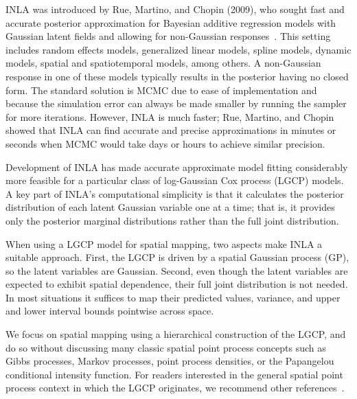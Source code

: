 \documentclass[]{interact}
\begin{document}
INLA was introduced by Rue, Martino, and Chopin (2009), who sought fast and
accurate posterior approximation for Bayesian additive regression models with
Gaussian latent fields and allowing for non-Gaussian responses~\cite{rueetal}.
This setting includes random effects models, generalized linear models, spline
models, dynamic models, spatial and spatiotemporal models, among others.
A non-Gaussian response in one of these models typically results in the
posterior having no closed form. The standard solution is MCMC due to ease of
implementation and because the simulation error can always be made smaller by
running the sampler for more iterations. However, INLA is much faster; Rue,
Martino, and Chopin showed that INLA can find accurate and precise
approximations in minutes or seconds when MCMC would take days or hours to
achieve similar precision.


Development of INLA has made accurate approximate model fitting considerably
more feasible for a particular class of log-Gaussian Cox process (LGCP)
models. A key part of INLA's computational simplicity is that it calculates
the posterior distribution of each latent Gaussian variable one at a time;
that is, it provides only the posterior marginal distributions rather than the
full joint distribution.

When using a LGCP model for spatial mapping, two aspects make INLA a suitable
approach. First, the LGCP is driven by a spatial Gaussian process (GP), so the
latent variables are Gaussian. Second, even though the latent variables are
expected to exhibit spatial dependence, their full joint distribution is not
needed. In most situations it suffices to map their predicted values, variance,
and upper and lower interval bounds pointwise across space.

We focus on spatial mapping using a hierarchical construction of the LGCP, and
do so without discussing many classic spatial point process concepts such as
Gibbs processes, Markov processes, point process densities, or the Papangelou
conditional intensity function. For readers interested in the general spatial
point process context in which the LGCP originates, we recommend other
references~\cite{moellerwaagepetersen, digglepoint, cressie}.
\end{document}
